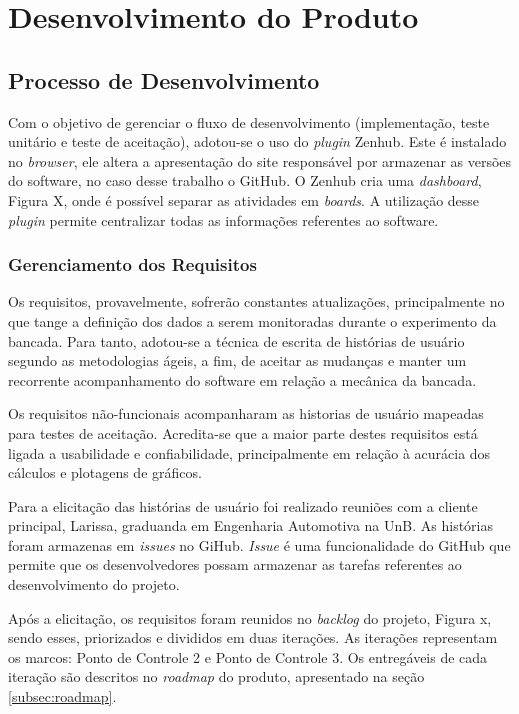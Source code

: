 \section{Desenvolvimento do Produto}

\subsection{Processo de Desenvolvimento}

	Com o objetivo de gerenciar o fluxo de desenvolvimento (implementação, teste unitário e teste de aceitação), adotou-se o uso do \textit{plugin} Zenhub. Este é instalado no \textit{browser}, ele altera a apresentação do site responsável por armazenar as versões do software, no caso desse trabalho o GitHub. O Zenhub cria uma \textit{dashboard}, Figura X,  onde é possível separar as atividades em \textit{boards}. A utilização desse \textit{plugin} permite centralizar todas as informações referentes ao software.


\subsubsection{Gerenciamento dos Requisitos}

	Os requisitos, provavelmente, sofrerão constantes atualizações, principalmente no que tange a definição dos dados a serem monitoradas durante o experimento da bancada. Para tanto, adotou-se a técnica de escrita de histórias de usuário segundo as metodologias ágeis, a fim, de aceitar as mudanças e manter um recorrente acompanhamento do software em relação a mecânica da bancada.

	Os requisitos não-funcionais acompanharam as historias de usuário mapeadas para testes de aceitação. Acredita-se que a maior parte destes requisitos está ligada a usabilidade e confiabilidade, principalmente em relação à acurácia dos cálculos e plotagens de gráficos.

	Para a elicitação das histórias de usuário foi realizado reuniões com a cliente principal, Larissa, graduanda em Engenharia Automotiva na UnB. As histórias foram armazenas em \textit{issues} no GiHub. \textit{Issue} é uma funcionalidade do GitHub que permite que os desenvolvedores possam armazenar as tarefas referentes ao desenvolvimento do projeto.

	Após a elicitação, os requisitos foram reunidos no \textit{backlog} do projeto, Figura x, sendo esses, priorizados e divididos em duas iterações. As iterações representam os marcos: Ponto de Controle 2 e Ponto de Controle 3. Os entregáveis de cada iteração são descritos no \textit{roadmap} do produto, apresentado na seção \ref{subsec:roadmap}.

